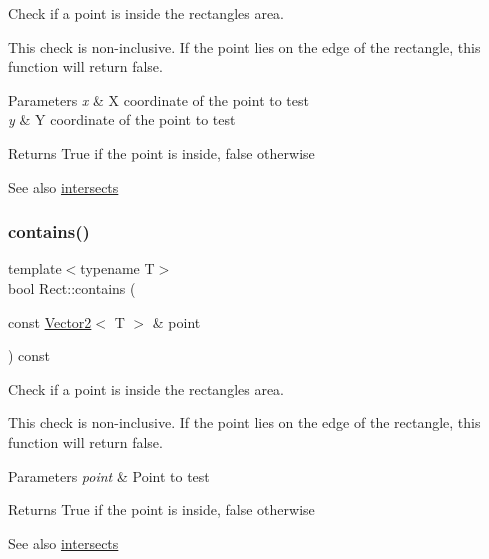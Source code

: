Check if a point is inside the rectangle\textquotesingle{}s area. 

This check is non-\/inclusive. If the point lies on the edge of the rectangle, this function will return false.


\begin{DoxyParams}{Parameters}
{\em x} & X coordinate of the point to test \\
\hline
{\em y} & Y coordinate of the point to test\\
\hline
\end{DoxyParams}
\begin{DoxyReturn}{Returns}
True if the point is inside, false otherwise
\end{DoxyReturn}
\begin{DoxySeeAlso}{See also}
\mbox{\hyperlink{classsf_1_1_rect_ad90321b1135cad31589f2db2f9b772db}{intersects}} \begin{DoxyVerb}\end{DoxyVerb}
 
\end{DoxySeeAlso}
\mbox{\label{classsf_1_1_rect_aa254e12d95ecf460ace8b2784fbab5eb}} 
\subsubsection{\texorpdfstring{contains()}{contains()}\hspace{0.1cm}{\footnotesize\ttfamily [2/2]}}
{\footnotesize\ttfamily template$<$typename T$>$ \\
bool Rect\+::contains (\begin{DoxyParamCaption}\item[{const \mbox{\hyperlink{classsf_1_1_vector2}{Vector2}}$<$ T $>$ \&}]{point }\end{DoxyParamCaption}) const}



Check if a point is inside the rectangle\textquotesingle{}s area. 

This check is non-\/inclusive. If the point lies on the edge of the rectangle, this function will return false.


\begin{DoxyParams}{Parameters}
{\em point} & Point to test\\
\hline
\end{DoxyParams}
\begin{DoxyReturn}{Returns}
True if the point is inside, false otherwise
\end{DoxyReturn}
\begin{DoxySeeAlso}{See also}
\mbox{\hyperlink{classsf_1_1_rect_ad90321b1135cad31589f2db2f9b772db}{intersects}} \begin{DoxyVerb}\end{DoxyVerb}
 
\end{DoxySeeAlso}
\mbox{\label{classsf_1_1_rect_ad90321b1135cad31589f2db2f9b772db}} 
